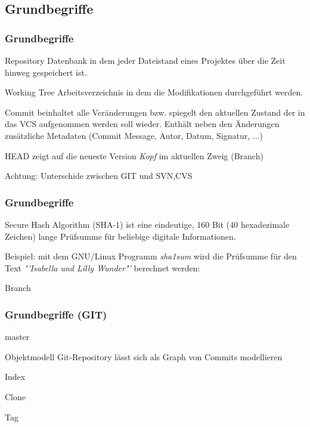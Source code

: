 \documentclass{beamer}
\begin{document}
\subsection{Grundbegriffe}
\begin{frame}\frametitle{Grundbegriffe}
\begin{block}{Repository}
Datenbank in dem jeder Dateistand eines Projektes über die Zeit hinweg gespeichert ist.
\end{block}

\begin{block}{Working Tree}
Arbeitsverzeichnis in dem die Modifikationen durchgeführt werden.
\end{block}

\begin{block}{Commit}
beinhaltet alle Veränderungen bzw. spiegelt den aktuellen Zustand der in das VCS aufgenommen werden soll wieder. Enthält neben den Änderungen zusätzliche Metadaten (Commit Message, Autor, Datum, Signatur, ...)
\end{block}

\begin{block}{HEAD}
zeigt auf die neueste Version \textit{Kopf} im aktuellen Zweig (Branch)

Achtung: Unterschide zwischen GIT und SVN,CVS
\end{block}
\end{frame}

\begin{frame}\frametitle{Grundbegriffe}
\begin{block}{Secure Hash Algorithm (SHA-1)}
ist eine eindeutige, 160 Bit (40 hexadezimale Zeichen) lange Prüfsumme für beliebige digitale Informationen.
\end{block}

\begin{exampleblock}{Beispiel:}
mit dem GNU/Linux Programm \textit{sha1sum} wird die Prüfsumme für den Text \textit{"'Isabella und Lilly Wunder"'} berechnet werden:

\end{exampleblock}

\begin{block}{Branch}
\end{block}

\end{frame}
\begin{frame}\frametitle{Grundbegriffe (GIT)}
\begin{block}{master}
\end{block}

\begin{block}{Objektmodell}
Git-Repository lässt sich als Graph von Commits modellieren
\end{block}

\begin{block}{Index}
\end{block}

\begin{block}{Clone}
\end{block}

\begin{block}{Tag}
\end{block}

\end{frame}
\end{document}
